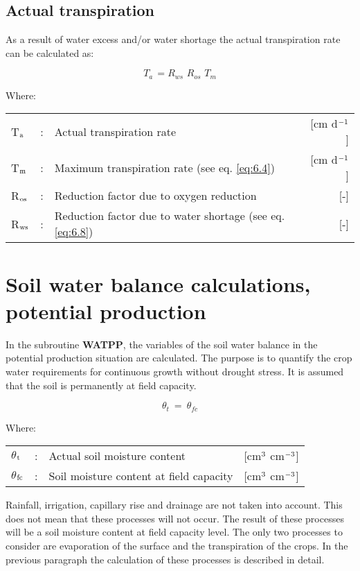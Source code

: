 \subsection{Actual transpiration}
As a result of water excess and/or water shortage the actual transpiration rate can be
calculated as:

\begin{equation}
T_{a~} = R_{ws} \,\, R_{os} \,\, T_{m} 
\end{equation}

Where:\\[5pt]
\begin{tabularx}{\textwidth}{llXr}
 T$_{{\rm a}}$ &:& Actual transpiration rate & [cm d$^{{\rm -1}}$]\\
 T$_{{\rm m}}$ &:& Maximum transpiration rate (see eq. \ref{eq:6.4}) & [cm d$^{{\rm -1}}$]\\
 R$_{{\rm os}}$ &:& Reduction factor due to oxygen reduction & [-]\\
 R$_{{\rm ws}}$ &:& Reduction factor due to water shortage (see eq. \ref{eq:6.8}) & [-]\\
\end{tabularx}
 
\section{Soil water balance calculations, potential production}
\label{sec:WATPP}

In the subroutine {\bf WATPP}, the variables of the soil water balance in the potential 
production situation are calculated. The purpose is to quantify the crop water requirements for
continuous growth without drought stress. It is assumed that the soil is permanently at
field capacity.

\begin{equation}
\theta  _{t} ~ =~\theta  _{fc} 
\end{equation}

Where:\\[5pt]
\begin{tabularx}{\textwidth}{llXr}
 $\theta$$_{{\rm t}}$ &:& Actual soil moisture content & [cm$^{{\rm 3}}$ cm$^{{\rm -3}}$]\\
 $\theta$$_{{\rm fc}}$ &:& Soil moisture content at field capacity & [cm$^{{\rm 3}}$ cm$^{{\rm -3}}$]\\
\end{tabularx}
 
Rainfall, irrigation, capillary rise and drainage are not taken into account. This does not
mean that these processes will not occur. The result of these processes will be a soil
moisture content at field capacity level. The only two processes to consider are evaporation of 
the surface and the transpiration of the crops. In the previous paragraph the
calculation of these processes is described in detail.


